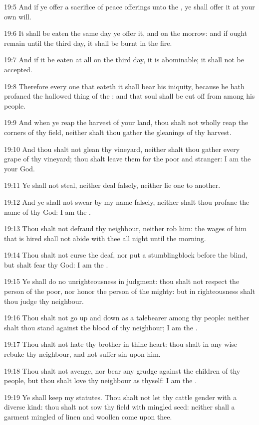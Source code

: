 19:5 And if ye offer a sacrifice of peace offerings unto the \LORD, ye
shall offer it at your own will.

19:6 It shall be eaten the same day ye offer it, and on the morrow:
and if ought remain until the third day, it shall be burnt in the
fire.

19:7 And if it be eaten at all on the third day, it is abominable; it
shall not be accepted.

19:8 Therefore every one that eateth it shall bear his iniquity,
because he hath profaned the hallowed thing of the \LORD: and that soul
shall be cut off from among his people.

19:9 And when ye reap the harvest of your land, thou shalt not wholly
reap the corners of thy field, neither shalt thou gather the gleanings
of thy harvest.

19:10 And thou shalt not glean thy vineyard, neither shalt thou gather
every grape of thy vineyard; thou shalt leave them for the poor and
stranger: I am the \LORD your God.

19:11 Ye shall not steal, neither deal falsely, neither lie one to
another.

19:12 And ye shall not swear by my name falsely, neither shalt thou
profane the name of thy God: I am the \LORD.

19:13 Thou shalt not defraud thy neighbour, neither rob him: the wages
of him that is hired shall not abide with thee all night until the
morning.

19:14 Thou shalt not curse the deaf, nor put a stumblingblock before
the blind, but shalt fear thy God: I am the \LORD.

19:15 Ye shall do no unrighteousness in judgment: thou shalt not
respect the person of the poor, nor honor the person of the mighty:
but in righteousness shalt thou judge thy neighbour.

19:16 Thou shalt not go up and down as a talebearer among thy people:
neither shalt thou stand against the blood of thy neighbour; I am the
\LORD.

19:17 Thou shalt not hate thy brother in thine heart: thou shalt in
any wise rebuke thy neighbour, and not suffer sin upon him.

19:18 Thou shalt not avenge, nor bear any grudge against the children
of thy people, but thou shalt love thy neighbour as thyself: I am the
\LORD.

19:19 Ye shall keep my statutes. Thou shalt not let thy cattle gender
with a diverse kind: thou shalt not sow thy field with mingled seed:
neither shall a garment mingled of linen and woollen come upon thee.

